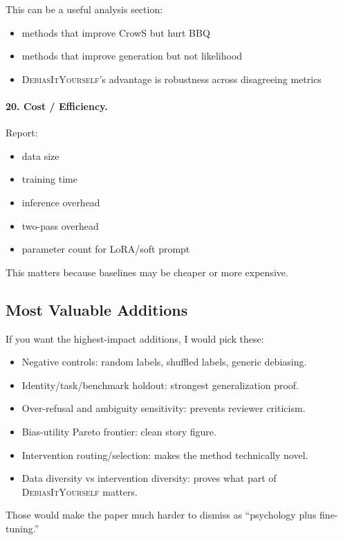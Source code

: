 \documentclass[11pt]{article}
\newcommand{\diy}{\textsc{DebiasItYourself}}
\begin{document}
This can be a useful analysis section:
\begin{itemize}[leftmargin=1.4em,itemsep=1pt,topsep=2pt]
    \item methods that improve CrowS but hurt BBQ
    \item methods that improve generation but not likelihood
    \item \diy{}'s advantage is robustness across disagreeing metrics
\end{itemize}

\paragraph{20. Cost / Efficiency.}
Report:
\begin{itemize}[leftmargin=1.4em,itemsep=1pt,topsep=2pt]
    \item data size
    \item training time
    \item inference overhead
    \item two-pass overhead
    \item parameter count for LoRA/soft prompt
\end{itemize}
This matters because baselines may be cheaper or more expensive.

\subsection{Most Valuable Additions}

If you want the highest-impact additions, I would pick these:
\begin{itemize}[leftmargin=1.4em,itemsep=1pt,topsep=2pt]
    \item Negative controls: random labels, shuffled labels, generic debiasing.
    \item Identity/task/benchmark holdout: strongest generalization proof.
    \item Over-refusal and ambiguity sensitivity: prevents reviewer criticism.
    \item Bias-utility Pareto frontier: clean story figure.
    \item Intervention routing/selection: makes the method technically novel.
    \item Data diversity vs intervention diversity: proves what part of \diy{} matters.
\end{itemize}
Those would make the paper much harder to dismiss as ``psychology plus fine-tuning.''
\end{document}
